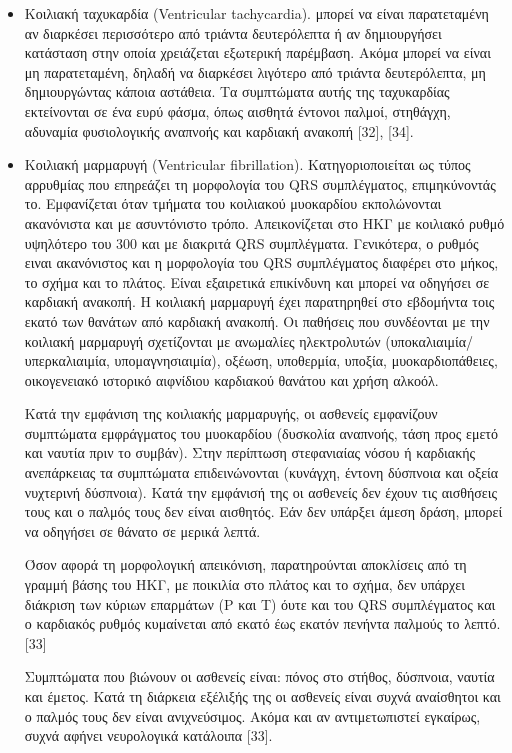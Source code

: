 \begin{itemize}
	\item  Κοιλιακή ταχυκαρδία (\en Ventricular tachycardia). \gr μπορεί να είναι παρατεταμένη αν διαρκέσει περισσότερο από τριάντα δευτερόλεπτα ή αν δημιουργήσει κατάσταση στην οποία χρειάζεται εξωτερική παρέμβαση. Ακόμα μπορεί να είναι μη παρατεταμένη, δηλαδή να διαρκέσει λιγότερο από τριάντα δευτερόλεπτα, μη δημιουργώντας κάποια αστάθεια. Τα συμπτώματα αυτής της ταχυκαρδίας εκτείνονται σε ένα ευρύ φάσμα, όπως αισθητά έντονοι παλμοί, στηθάγχη, αδυναμία φυσιολογικής αναπνοής και καρδιακή ανακοπή [32], [34].
	\par
	\item Κοιλιακή μαρμαρυγή (\en Ventricular fibrillation\gr). Κατηγοριοποιείται ως τύπος αρρυθμίας που επηρεάζει τη μορφολογία του \en QRS \gr συμπλέγματος, επιμηκύνοντάς το. Εμφανίζεται όταν τμήματα του κοιλιακού μυοκαρδίου εκπολώνονται ακανόνιστα και με ασυντόνιστο τρόπο. Απεικονίζεται στο ΗΚΓ με κοιλιακό ρυθμό υψηλότερο του 300 και με διακριτά \en QRS \gr συμπλέγματα. Γενικότερα, ο ρυθμός ειναι ακανόνιστος και η μορφολογία του \en QRS \gr συμπλέγματος διαφέρει στο μήκος, το σχήμα και το πλάτος. Είναι εξαιρετικά επικίνδυνη και μπορεί να οδηγήσει σε καρδιακή ανακοπή. Η κοιλιακή μαρμαρυγή έχει παρατηρηθεί στο εβδομήντα τοις εκατό των θανάτων από καρδιακή ανακοπή. Οι παθήσεις που συνδέονται με την κοιλιακή μαρμαρυγή σχετίζονται με ανωμαλίες ηλεκτρολυτών (υποκαλιαιμία/υπερκαλιαιμία, υπομαγνησιαιμία), οξέωση, υποθερμία, υποξία, μυοκαρδιοπάθειες, οικογενειακό ιστορικό αιφνίδιου καρδιακού θανάτου και χρήση αλκοόλ.
	\par
	Κατά την εμφάνιση της κοιλιακής μαρμαρυγής, οι ασθενείς εμφανίζουν συμπτώματα εμφράγματος του μυοκαρδίου (δυσκολία αναπνοής, τάση προς εμετό και ναυτία πριν το συμβάν). Στην περίπτωση στεφανιαίας νόσου ή καρδιακής ανεπάρκειας τα συμπτώματα επιδεινώνονται (κυνάγχη, έντονη δύσπνοια και  οξεία νυχτερινή δύσπνοια). Κατά την εμφάνισή της οι ασθενείς δεν έχουν τις αισθήσεις τους και ο παλμός τους δεν είναι αισθητός. Εάν δεν υπάρξει άμεση δράση, μπορεί να οδηγήσει σε θάνατο σε μερικά λεπτά.
	\par
	Όσον αφορά τη μορφολογική απεικόνιση, παρατηρούνται αποκλίσεις από τη γραμμή βάσης του ΗΚΓ, με ποικιλία στο πλάτος και το σχήμα, δεν υπάρχει διάκριση των κύριων επαρμάτων (Ρ και Τ) όυτε και του \en QRS \gr συμπλέγματος και ο καρδιακός ρυθμός κυμαίνεται από εκατό έως εκατόν πενήντα παλμούς το λεπτό. [33]
	\par
	Συμπτώματα που βιώνουν οι ασθενείς είναι: πόνος στο στήθος, δύσπνοια, ναυτία και έμετος. Κατά τη διάρκεια εξέλιξής της οι ασθενείς είναι συχνά αναίσθητοι και ο παλμός τους δεν είναι ανιχνεύσιμος. Ακόμα και αν αντιμετωπιστεί εγκαίρως, συχνά αφήνει νευρολογικά κατάλοιπα [33]. 

\end{itemize}
